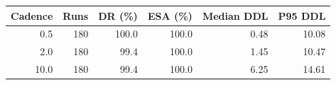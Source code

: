 \begin{tabular}{@{}rrrrrr@{}}
\toprule
Cadence & Runs & DR (\%) & ESA (\%) & Median DDL & P95 DDL \\
\midrule
0.5 & 180 & 100.0 & 100.0 & 0.48 & 10.08 \\
2.0 & 180 & 99.4 & 100.0 & 1.45 & 10.47 \\
10.0 & 180 & 99.4 & 100.0 & 6.25 & 14.61 \\
\bottomrule
\end{tabular}
